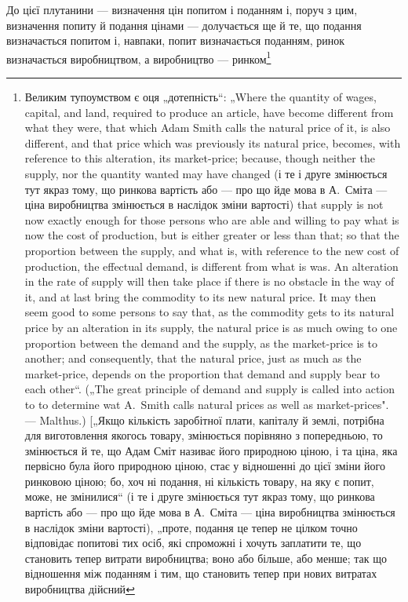 До цієї плутанини — визначення цін попитом і поданням і,
поруч з цим, визначення попиту й подання цінами — долучається
ще й те, що подання визначається попитом і, навпаки,
попит визначається поданням, ринок визначається виробництвом,
а виробництво — ринком\footnote{
Великим тупоумством є оця „дотепність“: „Where the quantity of wages,
capital, and land, required to produce an article, have become different from what
they were, that which Adam Smith calls the natural price of it, is also different,
and that price which was previously its natural price, becomes, with reference to
this alteration, its market-price; because, though neither the supply, nor the quantity
wanted may have changed (і те і друге змінюється тут якраз тому, що
ринкова вартість або — про що йде мова в А.~Сміта — ціна виробництва змінюється
в наслідок зміни вартості) that supply is not now exactly enough for
those persons who are able and willing to pay what is now the cost of production,
but is either greater or less than that; so that the proportion between the supply,
and what is, with reference to the new cost of production, the effectual demand,
is different from what is was. An alteration in the rate of supply will then take
place if there is no obstacle іn the way of it, and at last bring the commodity
to its new natural price. It may then seem good to some persons to say that, as
the commodity gets to its natural price by an alteration in its supply, the natural
price is as much owing to one proportion between the demand and the supply, as
the market-price is to another; and consequently, that the natural price, just as
much as the market-price, depends on the proportion that demand and supply
bear to each other“. („The great principle of demand and supply is called into
action to to determine wat A.~Smith calls natural prices as well as market-prices". —
Malthus.) [„Якщо кількість заробітної плати, капіталу й землі, потрібна для
виготовлення якогось товару, змінюється порівняно з попередньою, то змінюється
й те, що Адам Сміт називає його природною ціною, і та ціна, яка
первісно була його природною ціною, стає у відношенні до цієї зміни його
ринковою ціною; бо, хоч ні подання, ні кількість товару, на яку є попит,
може, не змінилися“ (і те і друге змінюється тут якраз тому, що ринкова
вартість або — про що йде мова в А.~Сміта — ціна виробництва змінюється
в наслідок зміни вартості), „проте, подання це тепер не цілком точно відповідає
попитові тих осіб, які спроможні і хочуть заплатити те, що становить тепер
витрати виробництва; воно або більше, або менше; так що відношення між
поданням і тим, що становить тепер при нових витратах виробництва дійсний
}
